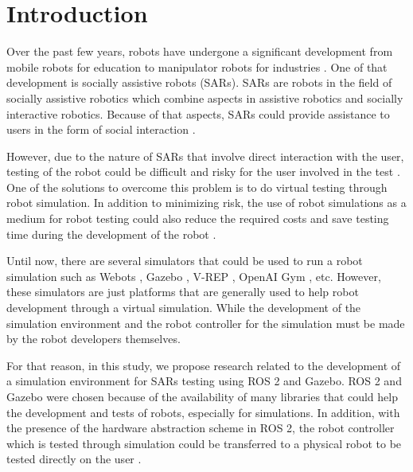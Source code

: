 \section{Introduction}
\label{sec:introduction}

Over the past few years,
  robots have undergone a significant development from mobile robots for education \citep{goncalves2009} to manipulator robots for industries \citep{blatnicky2020}.
One of that development is socially assistive robots (SARs).
SARs are robots in the field of socially assistive robotics which combine aspects in assistive robotics and socially interactive robotics.
Because of that aspects,
  SARs could provide assistance to users in the form of social interaction \citep{seifer2005}.

However, due to the nature of SARs that involve direct interaction with the user,
  testing of the robot could be difficult and risky for the user involved in the test \citep{erickson2020}.
One of the solutions to overcome this problem is to do virtual testing through robot simulation.
In addition to minimizing risk,
  the use of robot simulations as a medium for robot testing could also reduce the required costs and save testing time during the development of the robot \citep{takaya2016}.

Until now, there are several simulators that could be used to run a robot simulation such as Webots \citep{michel2004}, Gazebo \citep{koenig2004}, V-REP \citep{rohmer2013}, OpenAI Gym \citep{brockman2016}, etc.
However, these simulators are just platforms that are generally used to help robot development through a virtual simulation.
While the development of the simulation environment and the robot controller for the simulation must be made by the robot developers themselves.

For that reason, in this study,
  we propose research related to the development of a simulation environment for SARs testing using ROS 2 and Gazebo.
ROS 2 and Gazebo were chosen because of the availability of many libraries that could help the development and tests of robots, especially for simulations.
In addition, with the presence of the hardware abstraction scheme in ROS 2,
  the robot controller which is tested through simulation could be transferred to a physical robot to be tested directly on the user \citep{takaya2016}.
